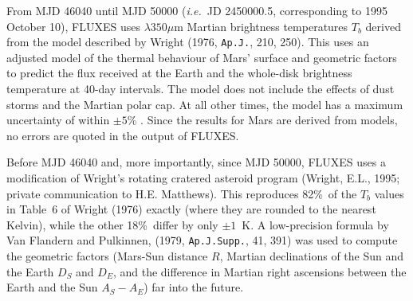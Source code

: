 \documentclass[11pt,twoside]{article}
\renewcommand{\_}{\texttt{\symbol{95}}}
\begin{document}
From MJD 46040 until MJD 50000 ({\em{i.e.}}\ JD 2450000.5, corresponding to 1995
October 10), FLUXES uses $\lambda350\mu$m Martian brightness temperatures
$T_b$ derived from the model described by Wright (1976, {\tt{Ap.J.}}, 210, 250).
This uses an adjusted model of the thermal
behaviour of Mars' surface and geometric factors to predict the flux received at
the Earth and the whole-disk brightness temperature at 40-day intervals. The
model does not include the effects of dust storms and the Martian polar cap. At
all other times, the model has a maximum uncertainty of within $\pm5$\% . Since
the results for Mars are derived from models, no errors are quoted in the output
of FLUXES. 

Before MJD 46040 and, more importantly, since MJD 50000, FLUXES uses a 
modification of Wright's rotating cratered asteroid program (Wright, 
E.L., 1995; private communication to H.E. Matthews). This reproduces 
82\%\ of the $T_b$ values in Table~6 of Wright (1976) exactly (where they are
rounded to the nearest Kelvin), while the other 18\%\ differ by only $\pm1$~K. 
A low-precision formula by Van Flandern and Pulkinnen, 
(1979, {\tt{Ap.J.Supp.}}, 41, 391)
was used to compute the geometric factors (Mars-Sun
distance $R$, Martian declinations of the Sun and the Earth $D_S$ and $D_E$,
and the difference in Martian right ascensions between the Earth and the Sun
$A_S - A_E$) far into the future. 
\end{document}
